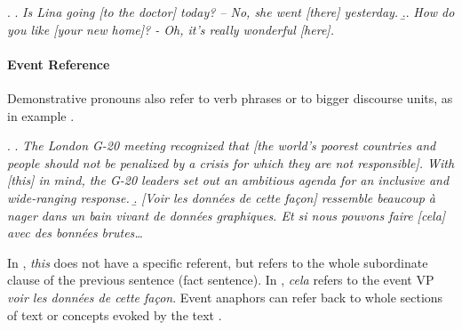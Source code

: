 \documentclass[a4paper]{article}
\begin{document}
{{%
\ex.
\a. {\sl Is Lina going [to the doctor] today? -- No, she went [there] yesterday.}
\b.. {\sl How do you like [your new home]? - Oh, it's really wonderful [here].}

\paragraph*{Event Reference}

Demonstrative pronouns also refer to verb phrases or to bigger discourse units, as in example \Next. 

\ex.
\a. {\sl The London G-20 meeting recognized that [the world's poorest countries and people should not be penalized by a crisis for which they are not responsible]. With [this] in mind, the G-20 leaders set out an ambitious agenda for an inclusive and wide-ranging response.}
\b. \textsl{[Voir les données de cette façon] ressemble beaucoup à nager dans un
bain vivant de données graphiques. Et si nous pouvons faire [cela] avec des
bonnées brutes\ldots}

In \Last[a], {\sl this} does not have a specific referent, but refers to the
whole subordinate clause of the previous sentence (fact sentence). In \Last[b],
\textsl{cela} refers to the event VP \textsl{voir les données de cette façon}.
Event anaphors can refer back to whole sections of text or concepts evoked by
the text \cite[p. 8]{GuillouEtAlGuide}. 


% 

}}
\end{document}
